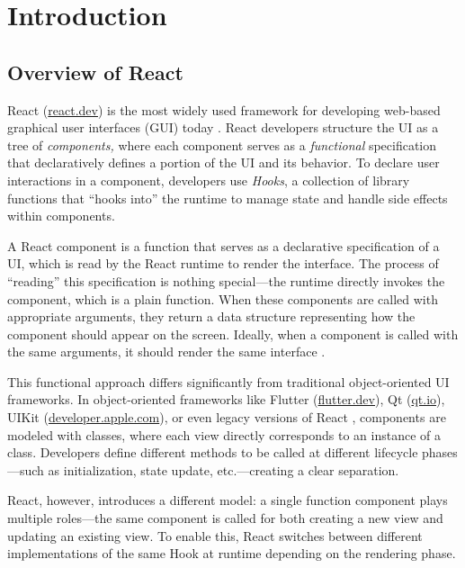 \chapter{Introduction}\label{chap:intro}
\section{Overview of React}
React (\href{https://react.dev/}{react.dev}) is the most widely used framework for developing web-based graphical user interfaces (GUI) today \citep{Sta24Stack}.
React developers structure the UI as a tree of \emph{components,} where each component serves as a \emph{functional} specification that declaratively defines a portion of the UI and its behavior.
To declare user interactions in a component, developers use \emph{Hooks}, a collection of library functions that ``hooks into'' the runtime to manage state and handle side effects within components.

A React component is a function that serves as a declarative specification of a UI, which is read by the React runtime to render the interface.
The process of ``reading'' this specification is nothing special---the runtime directly invokes the component, which is a plain function.
When these components are called with appropriate arguments, they return a data structure representing how the component should appear on the screen.
Ideally, when a component is called with the same arguments, it should render the same interface \citep{Cac16React}.

This functional approach differs significantly from traditional object-oriented UI frameworks.
In object-oriented frameworks like Flutter (\href{https://flutter.dev/}{flutter.dev}), Qt (\href{https://www.qt.io/}{qt.io}), UIKit (\href{https://developer.apple.com/documentation/uikit/}{developer.apple.com}), or even legacy versions of React \citep{Met25Component,MadLhoTip20Semantics}, components are modeled with classes, where each view directly corresponds to an instance of a class.
Developers define different methods to be called at different lifecycle phases---such as initialization, state update, etc.---creating a clear separation.

React, however, introduces a different model: a single function component plays multiple roles---the same component is called for both creating a new view and updating an existing view.
To enable this, React switches between different implementations of the same Hook at runtime depending on the rendering phase.

